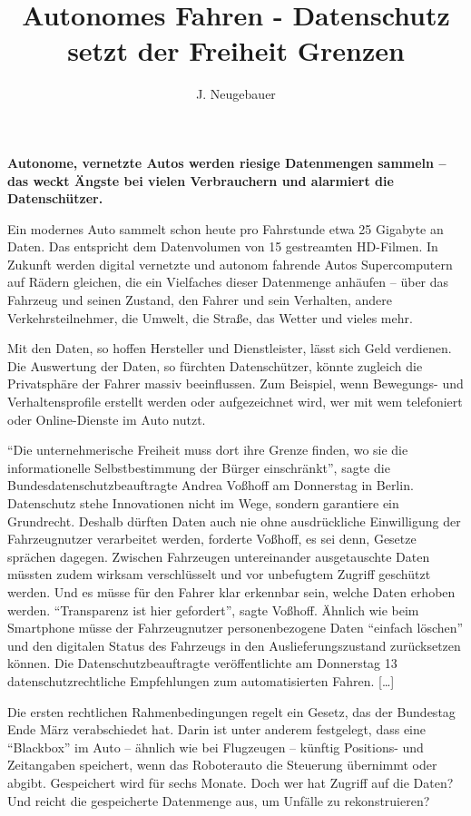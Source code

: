 \documentclass[9pt, a4paper, twocolumn, landscape]{scrartcl}
\author{J. Neugebauer}
\title{Autonomes Fahren - Datenschutz setzt der Freiheit Grenzen}
\date{\Heute}
\begin{document}
\TITEL\vspace{-1em}

\textbf{Autonome, vernetzte Autos werden riesige Datenmengen sammeln – das weckt Ängste bei vielen Verbrauchern und alarmiert die Datenschützer.}

\begin{zeilenNr}
Ein modernes Auto sammelt schon heute pro Fahrstunde etwa 25 Gigabyte an Daten. Das entspricht dem Datenvolumen von 15 gestreamten HD-Filmen. In Zukunft werden digital vernetzte und autonom fahrende Autos Supercomputern auf Rädern gleichen, die ein Vielfaches dieser Datenmenge anhäufen – über das Fahrzeug und seinen Zustand, den Fahrer und sein Verhalten, andere Verkehrsteilnehmer, die Umwelt, die Straße, das Wetter und vieles mehr.

Mit den Daten, so hoffen Hersteller und Dienstleister, lässt sich Geld verdienen. Die Auswertung der Daten, so fürchten Datenschützer, könnte zugleich die Privatsphäre der Fahrer massiv beeinflussen. Zum Beispiel, wenn Bewegungs- und Verhaltensprofile erstellt werden oder aufgezeichnet wird, wer mit wem telefoniert oder Online-Dienste im Auto nutzt.

\enquote{Die unternehmerische Freiheit muss dort ihre Grenze finden, wo sie die informationelle Selbstbestimmung der Bürger einschränkt}, sagte die Bundesdatenschutzbeauftragte Andrea Voßhoff am Donnerstag in Berlin. Datenschutz stehe Innovationen nicht im Wege, sondern garantiere ein Grundrecht. Deshalb dürften Daten auch nie ohne ausdrückliche Einwilligung der Fahrzeugnutzer verarbeitet werden, forderte Voßhoff, es sei denn, Gesetze sprächen dagegen. Zwischen Fahrzeugen untereinander ausgetauschte Daten müssten zudem wirksam verschlüsselt und vor unbefugtem Zugriff geschützt werden. Und es müsse für den Fahrer klar erkennbar sein, welche Daten erhoben werden. \enquote{Transparenz ist hier gefordert}, sagte Voßhoff. Ähnlich wie beim Smartphone müsse der Fahrzeugnutzer personenbezogene Daten \enquote{einfach löschen} und den digitalen Status des Fahrzeugs in den Auslieferungszustand zurücksetzen können. Die Datenschutzbeauftragte veröffentlichte am Donnerstag 13 datenschutzrechtliche Empfehlungen zum automatisierten Fahren. [\dots]

Die ersten rechtlichen Rahmenbedingungen regelt ein Gesetz, das der Bundestag Ende März verabschiedet hat. Darin ist unter anderem festgelegt, dass eine \enquote{Blackbox} im Auto – ähnlich wie bei Flugzeugen – künftig Positions- und Zeitangaben speichert, wenn das Roboterauto die Steuerung übernimmt oder abgibt. Gespeichert wird für sechs Monate. Doch wer hat Zugriff auf die Daten? Und reicht die gespeicherte Datenmenge aus, um Unfälle zu rekonstruieren?


\end{zeilenNr}
\end{document}
